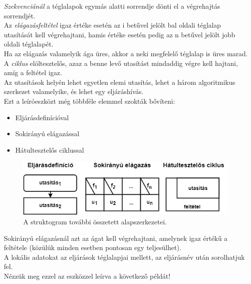 \documentclass[12pt,margin=0px]{article}
\begin{document}
	\noindent \emph{Szekvenciánál} a téglalapok egymás alatti sorrendje dönti el a végrehajtás sorrendjét.\\

    \noindent Az \emph{elágazásfeltétel} igaz értéke esetén az i betűvel jelölt bal oldali téglalap utasítását kell végrehajtani, hamis értéke esetén pedig az n betűvel jelölt jobb oldali téglalapét.\\ Ha az elágazás valamelyik ága üres, akkor a neki megfelelő téglalap is üres marad. \\

    \noindent A \emph{ciklus} elöltesztelős, azaz a benne levő utasítást mindaddig végre kell hajtani, amíg a feltétel igaz.\\
	
    \noindent Az utasítások helyén lehet egyetlen elemi utasítás, lehet a három algoritmikus szerkezet valamelyike, és lehet egy eljáráshívás.\\

     \noindent Ezt a leíróeszközt még többféle elemmel szokták bővíteni:
     \begin{itemize}
        \item Eljárásdefinícióval
        \item Sokirányú elágazással
        \item Hátultesztelős ciklussal
     \end{itemize}
	
		\begin{figure}[H]
			\centering
			\includegraphics[width=0.7\linewidth]{img/stuki_alapszerk2}
			\caption{A struktogram további összetett alapszerkezetei.}
			\label{fig:stuki_alapszerk2}
		\end{figure}
	
	\noindent Sokirányú elágazásnál azt az ágat kell végrehajtani, amelynek igaz értékű a feltétele (közülük minden esetben pontosan egy teljesülhet).\\
	
	\noindent A lokális adatokat az eljárások téglalapjai mellett, az eljárásnév után sorolhatjuk fel.\\
	
	\noindent Nézzük meg ezzel az eszközzel leírva a következő példát!\\
	
\end{document}
